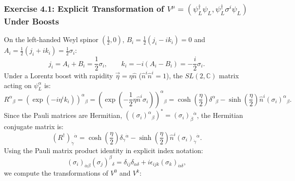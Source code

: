 \documentclass[11pt,a4paper]{article}
\begin{document}
\subsubsection{Exercise 4.1: Explicit Transformation of $V^\mu = (\psi_L^\dagger \psi_L, \psi_L^\dagger \sigma^i \psi_L)$ Under Boosts}
On the left-handed Weyl spinor $(\frac{1}{2},0)$, $B_i = \frac{1}{2}(j_i - ik_i) = 0$ and $A_i = \frac{1}{2}(j_i + ik_i) = \frac{1}{2}\sigma_i$:
\begin{equation}
    j_i = A_i + B_i = \frac{1}{2}\sigma_i, \qquad k_i = -i(A_i - B_i) = -\frac{i}{2}\sigma_i.
\end{equation}
Under a Lorentz boost with rapidity $\vec{\eta} = \eta \hat{n}$ ($\hat{n}^i \hat{n}^i = 1$), the $SL(2,\mathbb{C})$ matrix acting on $\psi_L^\alpha$ is:
\begin{equation}
    R^\alpha{}_\beta = \left(\exp\left(-i\eta^i k_i\right)\right)^\alpha{}_\beta = \left(\exp\left(-\frac{1}{2}\eta \hat{n}^i \sigma_i\right)\right)^\alpha{}_\beta = \cosh\left(\frac{\eta}{2}\right)\delta^\alpha{}_\beta - \sinh\left(\frac{\eta}{2}\right)\hat{n}^i (\sigma_i)^\alpha{}_\beta.
\end{equation}
Since the Pauli matrices are Hermitian, $((\sigma_i)^\alpha{}_\beta)^* = (\sigma_i)_{\dot{\beta}}{}^{\dot{\alpha}}$, the Hermitian conjugate matrix is:
\begin{equation}
    (R^\dagger)_{\dot{\gamma}}{}^{\dot{\alpha}} = \cosh\left(\frac{\eta}{2}\right)\delta_{\dot{\gamma}}{}^{\dot{\alpha}} - \sinh\left(\frac{\eta}{2}\right)\hat{n}^i (\sigma_i)_{\dot{\gamma}}{}^{\dot{\alpha}}.
\end{equation}
Using the Pauli matrix product identity in explicit index notation:
\begin{equation}
    (\sigma_i)_{\dot{\alpha}\beta}(\sigma_j)^\beta{}_\delta = \delta_{ij}\delta_{\dot{\alpha}\delta} + i\epsilon_{ijk}(\sigma_k)_{\dot{\alpha}\delta},
\end{equation}
we compute the transformations of $V^0$ and $V^k$:
\end{document}
